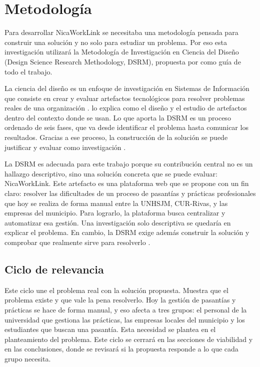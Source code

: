 
\section{Metodología}

Para desarrollar NicaWorkLink se necesitaba una metodología pensada para construir una solución y no solo para estudiar un problema. Por eso esta investigación utilizará la Metodología de Investigación en Ciencia del Diseño (Design Science Research Methodology, DSRM), propuesta por \textcite{peffers2007} como guía de todo el trabajo.

La ciencia del diseño es un enfoque de investigación en Sistemas de Información que consiste en crear y evaluar artefactos tecnológicos para resolver problemas reales de una organización \parencite{hevner2004}. \textcite{wieringa2014} lo explica como el diseño y el estudio de artefactos dentro del contexto donde se usan. Lo que aporta la DSRM es un proceso ordenado de seis fases, que va desde identificar el problema hasta comunicar los resultados. Gracias a ese proceso, la construcción de la solución se puede justificar y evaluar como investigación \parencite{peffers2007}.

La DSRM es adecuada para este trabajo porque su contribución central no es un hallazgo descriptivo, sino una solución concreta que se puede evaluar: NicaWorkLink. Este artefacto es una plataforma web que se propone con un fin claro: resolver las dificultades de un proceso de pasantías y prácticas profesionales que hoy se realiza de forma manual entre la UNHSJM, CUR-Rivas, y las empresas del municipio. Para lograrlo, la plataforma busca centralizar y automatizar esa gestión. Una investigación solo descriptiva se quedaría en explicar el problema. En cambio, la DSRM exige además construir la solución y comprobar que realmente sirve para resolverlo \parencite{hevner2004, peffers2007, wieringa2014}.


\subsection{Ciclo de relevancia}

Este ciclo une el problema real con la solución propuesta. Muestra que el problema existe y que vale la pena resolverlo. Hoy la gestión de pasantías y prácticas se hace de forma manual, y eso afecta a tres grupos: el personal de la universidad que gestiona las prácticas, las empresas locales del municipio y los estudiantes que buscan una pasantía. Esta necesidad se plantea en el planteamiento del problema. Este ciclo se cerrará en las secciones de viabilidad y en las conclusiones, donde se revisará si la propuesta responde a lo que cada grupo necesita.


